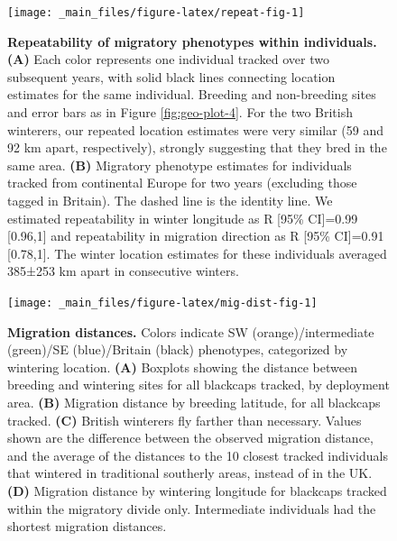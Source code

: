 \documentclass[a4paper, twoside]{templates/ociamthesis}
\begin{document}
\begin{figure}
\texttt{[image: \_main\_files/figure-latex/repeat-fig-1]} \caption{\textbf{Repeatability of migratory phenotypes within individuals.} \textbf{(A)} Each color represents one individual tracked over two subsequent years, with solid black lines connecting location estimates for the same individual. Breeding and non-breeding sites and error bars as in Figure \ref{fig:geo-plot-4}. For the two British winterers, our repeated location estimates were very similar (59 and 92 km apart, respectively), strongly suggesting that they bred in the same area. \textbf{(B)} Migratory phenotype estimates for individuals tracked from continental Europe for two years (excluding those tagged in Britain). The dashed line is the identity line. We estimated repeatability in winter longitude as R {[}95\% CI{]}=0.99 {[}0.96,1{]} and repeatability in migration direction as R {[}95\% CI{]}=0.91 {[}0.78,1{]}. The winter location estimates for these individuals averaged 385±253 km apart in consecutive winters.}\label{fig:repeat-fig}
\end{figure}



\begin{figure}
\texttt{[image: \_main\_files/figure-latex/mig-dist-fig-1]} \caption{\textbf{Migration distances.} Colors indicate SW (orange)/intermediate (green)/SE (blue)/Britain (black) phenotypes, categorized by wintering location. \textbf{(A)} Boxplots showing the distance between breeding and wintering sites for all blackcaps tracked, by deployment area. \textbf{(B)} Migration distance by breeding latitude, for all blackcaps tracked. \textbf{(C)} British winterers fly farther than necessary. Values shown are the difference between the observed migration distance, and the average of the distances to the 10 closest tracked individuals that wintered in traditional southerly areas, instead of in the UK. \textbf{(D)} Migration distance by wintering longitude for blackcaps tracked within the migratory divide only. Intermediate individuals had the shortest migration distances.}\label{fig:mig-dist-fig}
\end{figure}
\end{document}
